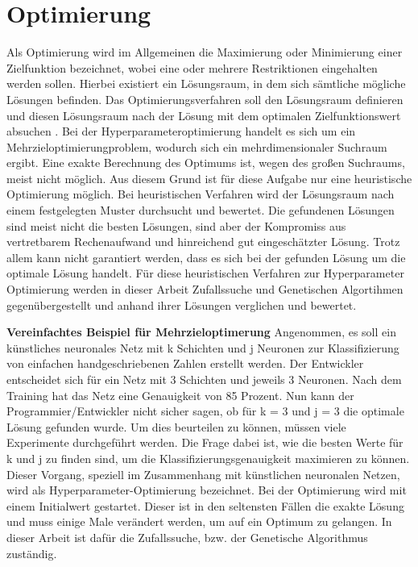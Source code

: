 \section{Optimierung}
Als Optimierung wird im Allgemeinen die Maximierung oder Minimierung einer Zielfunktion bezeichnet, wobei eine oder mehrere Restriktionen eingehalten werden sollen. Hierbei existiert ein Lösungsraum, in dem sich sämtliche mögliche Lösungen befinden. Das Optimierungsverfahren soll den Lösungsraum definieren und diesen Lösungsraum nach der Lösung mit dem optimalen Zielfunktionswert absuchen \cite[p.~15]{Gerdts2011}. Bei der Hyperparameteroptimierung handelt es sich um ein Mehrzieloptimierungproblem, wodurch sich ein mehrdimensionaler Suchraum ergibt. Eine exakte Berechnung des Optimums ist, wegen des großen Suchraums, meist nicht möglich. Aus diesem Grund ist für diese Aufgabe nur eine heuristische Optimierung möglich. Bei heuristischen Verfahren wird der Lösungsraum nach einem festgelegten Muster durchsucht und bewertet. Die gefundenen Lösungen sind meist nicht die besten Lösungen, sind aber der Kompromiss aus vertretbarem Rechenaufwand und hinreichend gut eingeschätzter Lösung. Trotz allem kann nicht garantiert werden, dass es sich bei der gefunden Lösung um die optimale Lösung handelt\cite{beume2006mehrkriterielle}. Für diese heuristischen Verfahren zur Hyperparameter Optimierung werden in dieser Arbeit Zufallssuche und Genetischen Algortihmen gegenübergestellt und anhand ihrer Lösungen verglichen und bewertet.


\textbf{Vereinfachtes Beispiel für Mehrzieloptimerung}
Angenommen, es soll ein künstliches neuronales Netz mit k Schichten und j Neuronen zur Klassifizierung von einfachen handgeschriebenen Zahlen erstellt werden. Der Entwickler entscheidet sich für ein Netz mit 3 Schichten und jeweils 3 Neuronen. Nach dem Training hat das Netz eine Genauigkeit von 85 Prozent. Nun kann der Programmier/Entwickler nicht sicher sagen, ob für k = 3 und j = 3  die optimale Lösung gefunden wurde. Um dies beurteilen zu können, müssen viele Experimente durchgeführt werden. Die Frage dabei ist, wie die besten Werte für k und j zu finden sind, um die Klassifizierungsgenauigkeit maximieren zu können. Dieser Vorgang, speziell im Zusammenhang mit künstlichen neuronalen Netzen, wird als Hyperparameter-Optimierung bezeichnet. Bei der Optimierung wird mit einem Initialwert gestartet. Dieser ist in den seltensten Fällen die exakte Lösung und muss einige Male verändert werden, um auf ein Optimum zu gelangen. In dieser Arbeit ist dafür die Zufallssuche, bzw. der Genetische Algorithmus zuständig\cite[p.~130]{Gad2018}. 


